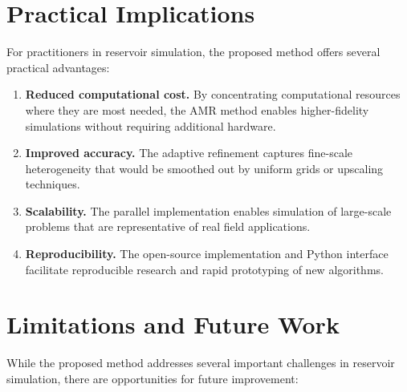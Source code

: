 \section{Practical Implications}
\label{sec:conclusion:practical}

For practitioners in reservoir simulation, the proposed method offers several practical advantages:

\begin{enumerate}
    \item \textbf{Reduced computational cost.} By concentrating computational resources where they are most needed, the AMR method enables higher-fidelity simulations without requiring additional hardware.

    \item \textbf{Improved accuracy.} The adaptive refinement captures fine-scale heterogeneity that would be smoothed out by uniform grids or upscaling techniques.

    \item \textbf{Scalability.} The parallel implementation enables simulation of large-scale problems that are representative of real field applications.

    \item \textbf{Reproducibility.} The open-source implementation and Python interface facilitate reproducible research and rapid prototyping of new algorithms.
\end{enumerate}

\section{Limitations and Future Work}
\label{sec:conclusion:future}

While the proposed method addresses several important challenges in reservoir simulation, there are opportunities for future improvement:


